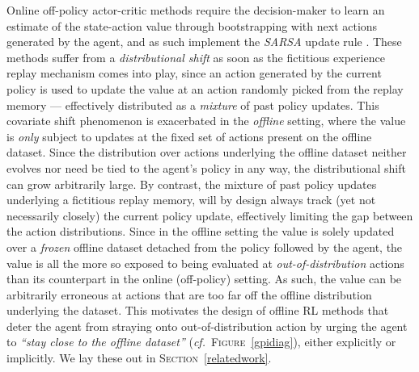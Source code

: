 Online off-policy actor-critic methods
require the decision-maker to learn an estimate of the state-action value
through bootstrapping with next actions generated by the agent,
and as such implement the \textit{SARSA} update rule
\cite{Rummery1994-qp, Thrun1995-sz, Sutton1996-ky, Van_Seijen2009-yw}.
These methods suffer from a \emph{distributional shift} \cite{Fu2019-kb}
as soon as the fictitious experience replay \cite{Lin1993-qe}
mechanism comes into play, since an action generated by the current policy
is used to update the value at an action randomly picked from the replay memory --- effectively
distributed as a \emph{mixture} of past policy updates.
This covariate shift phenomenon is exacerbated in the \emph{offline} setting,
where the value is \emph{only} subject to updates at the fixed set of actions present on the offline dataset.
Since the distribution over actions underlying the offline dataset neither evolves nor need be tied to the
agent's policy in any way, the distributional shift can grow arbitrarily large. By contrast,
the mixture of past policy updates underlying a fictitious replay memory, will by design
always track (yet not necessarily closely) the current policy update, effectively limiting the
gap between the action distributions.
Since
in the offline setting
the value is solely updated over a \emph{frozen} offline dataset detached from the policy
followed by the agent, the value is all the more so exposed to being evaluated at \emph{out-of-distribution} actions
than its counterpart in the online (off-policy) setting.
As such, the value can be arbitrarily erroneous at actions that are
too far off the offline distribution underlying the dataset.
This motivates the design of offline RL methods that
deter the agent from straying onto out-of-distribution action
by urging the agent to \textit{``stay close to the offline dataset''} (\textit{cf.}~\textsc{Figure}~\ref{gpidiag}),
either explicitly or implicitly.
We lay these out in \textsc{Section}~\ref{relatedwork}.

